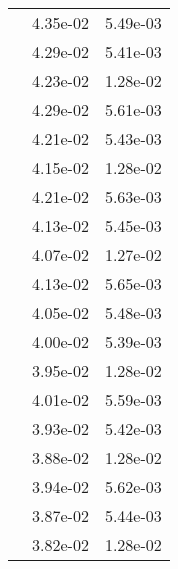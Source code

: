 \begin{table}
\begin{tabular}{c|cc|}
\multicolumn{1}{|c|}{} & \multicolumn{1}{|c|}{  4.35e-02} & \multicolumn{1}{|c|}{  5.49e-03} \\ 
\multicolumn{1}{|c|}{} & \multicolumn{1}{|c|}{  4.29e-02} & \multicolumn{1}{|c|}{  5.41e-03} \\ 
\multicolumn{1}{|c|}{} & \multicolumn{1}{|c|}{  4.23e-02} & \multicolumn{1}{|c|}{  1.28e-02} \\ 
\multicolumn{1}{|c|}{} & \multicolumn{1}{|c|}{  4.29e-02} & \multicolumn{1}{|c|}{  5.61e-03} \\ 
\multicolumn{1}{|c|}{} & \multicolumn{1}{|c|}{  4.21e-02} & \multicolumn{1}{|c|}{  5.43e-03} \\ 
\multicolumn{1}{|c|}{} & \multicolumn{1}{|c|}{  4.15e-02} & \multicolumn{1}{|c|}{  1.28e-02} \\ 
\multicolumn{1}{|c|}{} & \multicolumn{1}{|c|}{  4.21e-02} & \multicolumn{1}{|c|}{  5.63e-03} \\ 
\multicolumn{1}{|c|}{} & \multicolumn{1}{|c|}{  4.13e-02} & \multicolumn{1}{|c|}{  5.45e-03} \\ 
\multicolumn{1}{|c|}{} & \multicolumn{1}{|c|}{  4.07e-02} & \multicolumn{1}{|c|}{  1.27e-02} \\ 
\multicolumn{1}{|c|}{} & \multicolumn{1}{|c|}{  4.13e-02} & \multicolumn{1}{|c|}{  5.65e-03} \\ 
\multicolumn{1}{|c|}{} & \multicolumn{1}{|c|}{  4.05e-02} & \multicolumn{1}{|c|}{  5.48e-03} \\ 
\multicolumn{1}{|c|}{} & \multicolumn{1}{|c|}{  4.00e-02} & \multicolumn{1}{|c|}{  5.39e-03} \\ 
\multicolumn{1}{|c|}{} & \multicolumn{1}{|c|}{  3.95e-02} & \multicolumn{1}{|c|}{  1.28e-02} \\ 
\multicolumn{1}{|c|}{} & \multicolumn{1}{|c|}{  4.01e-02} & \multicolumn{1}{|c|}{  5.59e-03} \\ 
\multicolumn{1}{|c|}{} & \multicolumn{1}{|c|}{  3.93e-02} & \multicolumn{1}{|c|}{  5.42e-03} \\ 
\multicolumn{1}{|c|}{} & \multicolumn{1}{|c|}{  3.88e-02} & \multicolumn{1}{|c|}{  1.28e-02} \\ 
\multicolumn{1}{|c|}{} & \multicolumn{1}{|c|}{  3.94e-02} & \multicolumn{1}{|c|}{  5.62e-03} \\ 
\multicolumn{1}{|c|}{} & \multicolumn{1}{|c|}{  3.87e-02} & \multicolumn{1}{|c|}{  5.44e-03} \\ 
\multicolumn{1}{|c|}{} & \multicolumn{1}{|c|}{  3.82e-02} & \multicolumn{1}{|c|}{  1.28e-02} \\ 

\end{tabular}
\end{table}

